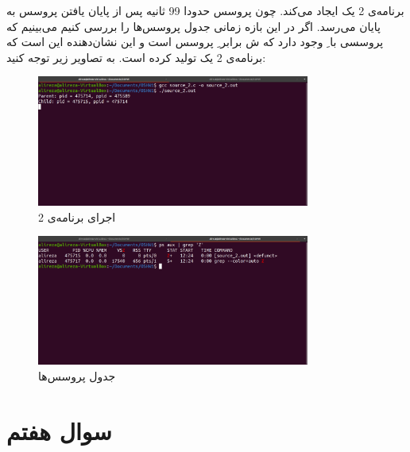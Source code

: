 \documentclass{article}
\begin{document}
برنامه‌ی 2 یک  ایجاد می‌کند. چون پروسس  حدودا 99 ثانیه پس از پایان یافتن پروسس  به پایان می‌رسد. اگر در این بازه زمانی جدول پروسس‌ها را بررسی کنیم می‌بینیم که پروسسی با ِ  وجود دارد که ش برابر ِ پروسس  است و این نشان‌دهنده این است که برنامه‌ی 2 یک  تولید کرده است. به تصاویر زیر توجه کنید:
\begin{figure}[H]
    \centering
    \includegraphics[width=0.8\textwidth]{figures/6.2.2.1.png}
    \caption{اجرای برنامه‌ی 2}
    \label{fig:fig1}
\end{figure}

\begin{figure}[H]
    \centering
    \includegraphics[width=0.8\textwidth]{figures/6.2.2.2.png}
    \caption{جدول پروسس‌ها}
    \label{fig:fig1}
\end{figure}

\section{سوال هفتم}
\end{document}
